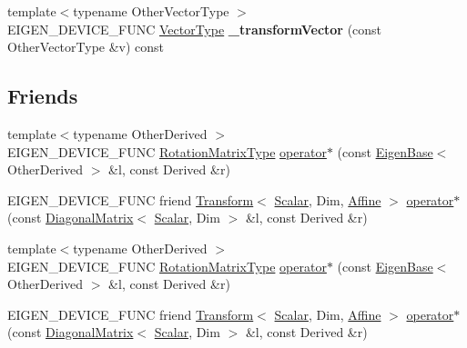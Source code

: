 \begin{DoxyCompactItemize}
\item 
\mbox{\label{class_eigen_1_1_rotation_base_a015ba3b47831570ec525f22b79253bbe}} 
{\footnotesize template$<$typename Other\+Vector\+Type $>$ }\\E\+I\+G\+E\+N\+\_\+\+D\+E\+V\+I\+C\+E\+\_\+\+F\+U\+NC \hyperlink{group___core___module}{Vector\+Type} {\bfseries \+\_\+transform\+Vector} (const Other\+Vector\+Type \&v) const
\end{DoxyCompactItemize}
\subsection*{Friends}
\begin{DoxyCompactItemize}
\item 
{\footnotesize template$<$typename Other\+Derived $>$ }\\E\+I\+G\+E\+N\+\_\+\+D\+E\+V\+I\+C\+E\+\_\+\+F\+U\+NC \hyperlink{class_eigen_1_1_rotation_base_a83602509674c9d635551998460342951}{Rotation\+Matrix\+Type} \hyperlink{class_eigen_1_1_rotation_base_affba3749838de939140b601e7db834e8}{operator$\ast$} (const \hyperlink{group___core___module_struct_eigen_1_1_eigen_base}{Eigen\+Base}$<$ Other\+Derived $>$ \&l, const Derived \&r)
\item 
E\+I\+G\+E\+N\+\_\+\+D\+E\+V\+I\+C\+E\+\_\+\+F\+U\+NC friend \hyperlink{group___geometry___module_class_eigen_1_1_transform}{Transform}$<$ \hyperlink{class_eigen_1_1_rotation_base_af9b43eac462d7aa70b018efd49c13ef4}{Scalar}, Dim, \hyperlink{group__enums_ggaee59a86102f150923b0cac6d4ff05107a71e768e0581725d919d0b05f4cb83234}{Affine} $>$ \hyperlink{class_eigen_1_1_rotation_base_a507ee9474b9d648cdc9d294f4e944d60}{operator$\ast$} (const \hyperlink{group___core___module_class_eigen_1_1_diagonal_matrix}{Diagonal\+Matrix}$<$ \hyperlink{class_eigen_1_1_rotation_base_af9b43eac462d7aa70b018efd49c13ef4}{Scalar}, Dim $>$ \&l, const Derived \&r)
\item 
{\footnotesize template$<$typename Other\+Derived $>$ }\\E\+I\+G\+E\+N\+\_\+\+D\+E\+V\+I\+C\+E\+\_\+\+F\+U\+NC \hyperlink{class_eigen_1_1_rotation_base_a83602509674c9d635551998460342951}{Rotation\+Matrix\+Type} \hyperlink{class_eigen_1_1_rotation_base_affba3749838de939140b601e7db834e8}{operator$\ast$} (const \hyperlink{group___core___module_struct_eigen_1_1_eigen_base}{Eigen\+Base}$<$ Other\+Derived $>$ \&l, const Derived \&r)
\item 
E\+I\+G\+E\+N\+\_\+\+D\+E\+V\+I\+C\+E\+\_\+\+F\+U\+NC friend \hyperlink{group___geometry___module_class_eigen_1_1_transform}{Transform}$<$ \hyperlink{class_eigen_1_1_rotation_base_af9b43eac462d7aa70b018efd49c13ef4}{Scalar}, Dim, \hyperlink{group__enums_ggaee59a86102f150923b0cac6d4ff05107a71e768e0581725d919d0b05f4cb83234}{Affine} $>$ \hyperlink{class_eigen_1_1_rotation_base_a507ee9474b9d648cdc9d294f4e944d60}{operator$\ast$} (const \hyperlink{group___core___module_class_eigen_1_1_diagonal_matrix}{Diagonal\+Matrix}$<$ \hyperlink{class_eigen_1_1_rotation_base_af9b43eac462d7aa70b018efd49c13ef4}{Scalar}, Dim $>$ \&l, const Derived \&r)
\end{DoxyCompactItemize}


